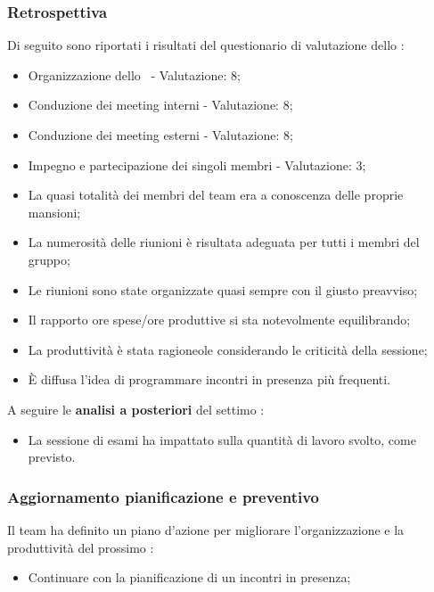 \subsubsection{Retrospettiva}

\par Di seguito sono riportati i risultati del questionario di valutazione dello :
\begin{itemize}
  \item Organizzazione dello \ - Valutazione: 8;
  \item Conduzione dei meeting interni - Valutazione: 8;
  \item Conduzione dei meeting esterni - Valutazione: 8;
  \item Impegno e partecipazione dei singoli membri - Valutazione: 3;
  \item La quasi totalità dei membri del team era a conoscenza delle proprie mansioni;
  \item La numerosità delle riunioni è risultata adeguata per tutti i membri del gruppo;
  \item Le riunioni sono state organizzate quasi sempre con il giusto preavviso;
  \item Il rapporto ore spese/ore produttive si sta notevolmente equilibrando;
  \item La produttività è stata ragioneole considerando le criticità della sessione;
  \item È diffusa l'idea di programmare incontri in presenza più frequenti.
\end{itemize}

\vspace{0.5\baselineskip}
\par A seguire le \textbf{analisi a posteriori} del settimo :
\begin{itemize}
  \item La sessione di esami ha impattato sulla quantità di lavoro svolto, come previsto.
\end{itemize}

\subsubsection{Aggiornamento pianificazione e preventivo}
\par Il team ha definito un piano d'azione per migliorare l'organizzazione e la produttività del prossimo :
\begin{itemize}
  \item Continuare con la pianificazione di un incontri in presenza;
\end{itemize}

